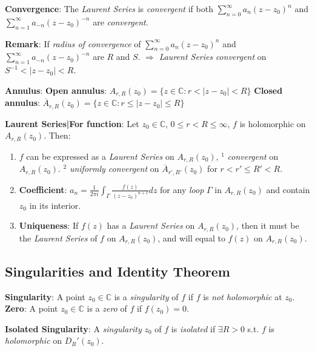 \documentclass[9pt]{article}
\begin{document}
\qquad \textbf{Convergence}: The \textit{Laurent Series} is \textit{convergent} if both $\sum^\infty_{n=0}a_n(z-z_0)^n$ and $\sum^\infty_{n=1}a_{-n}(z-z_0)^{-n}$ are \textit{convergent}.

\qquad \textbf{Remark}: {\small If \textit{radius of convergence} of $\sum^\infty_{n=0}a_n(z-z_0)^n$ and $\sum^\infty_{n=1}a_{-n}(z-z_0)^{-n}$ are $R$ and $S$. $\Rightarrow$ \textit{Laurent Series} \textit{convergent} on $S^{-1}<|z-z_0|<R$.}

\textbf{Annulus}: \textbf{Open annulus}: $A_{r,R}(z_0)=\{z\in\mathbb{C}:r<|z-z_0|<R\}$ \quad \textbf{Closed annulus}: $\overline{A}_{r,R}(z_0)=\{z\in\mathbb{C}:r\leq|z-z_0|\leq R\}$

\textbf{Laurent Series|For function}: Let $z_0\in\mathbb{C}$, $0\leq r<R\leq\infty$, $f$ is holomorphic on $A_{r,R}(z_0)$. Then:

\begin{enumerate}[itemsep=-2pt, topsep=-2pt]
    \item {\footnotesize $f$ can be expressed as a \textit{Laurent Series} on $A_{r,R}(z_0)$,} $^1$ \textit{convergent} on $A_{r,R}(z_0)$. $^2$ \textit{uniformly convergent} on $\overline{A}_{r',R'}(z_0)$ for $r<r'\leq R'<R$.
    \item \textbf{Coefficient}: $a_n=\frac{1}{2\pi i}\int_{\Gamma}\frac{f(z)}{(z-z_0)^{n+1}}dz$ for any \textit{loop} $\Gamma$ in $A_{r,R}(z_0)$ and contain $z_0$ in its interior.
    \item \textbf{Uniqueness}: {\footnotesize If $f(z)$ has a \textit{Laurent Series} on $A_{r,R}(z_0)$, then it must be the \textit{Laurent Series} of $f$ on $A_{r,R}(z_0)$, and will equal to $f(z)$ on $A_{r,R}(z_0)$.}
\end{enumerate}


\subsection{Singularities and Identity Theorem} %

\textbf{Singularity}: {\small A point $z_0\in\mathbb{C}$ is a \textit{singularity} of $f$ if $f$ is \textit{not holomorphic} at $z_0$.} \qquad \textbf{Zero}: {\small A point $z_0\in\mathbb{C}$ is a \textit{zero} of $f$ if $f(z_0)=0$.}

\textbf{Isolated Singularity}: {\small A \textit{singularity} $z_0$ of $f$ is \textit{isolated} if $\exists R>0$ s.t. $f$ is \textit{holomorphic} on $D_{R}'(z_0)$.}
\end{document}
